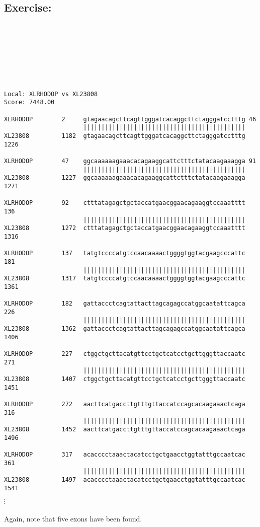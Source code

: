 \documentclass[12pt]{report}
\begin{document}
\subsection*{Exercise: }

\unix{}\\
\\
\\
\\
\\
\\

\unix{}
\begin{verbatim}
Local: XLRHODOP vs XL23808
Score: 7448.00

XLRHODOP        2     gtagaacagcttcagttgggatcacaggcttctagggatcctttg 46   
                      |||||||||||||||||||||||||||||||||||||||||||||
XL23808         1182  gtagaacagcttcagttgggatcacaggcttctagggatcctttg 1226 

XLRHODOP        47    ggcaaaaaagaaacacagaaggcattctttctatacaagaaagga 91   
                      |||||||||||||||||||||||||||||||||||||||||||||
XL23808         1227  ggcaaaaaagaaacacagaaggcattctttctatacaagaaagga 1271 

XLRHODOP        92    ctttatagagctgctaccatgaacggaacagaaggtccaaatttt 136  
                      |||||||||||||||||||||||||||||||||||||||||||||
XL23808         1272  ctttatagagctgctaccatgaacggaacagaaggtccaaatttt 1316 

XLRHODOP        137   tatgtccccatgtccaacaaaactggggtggtacgaagcccattc 181  
                      |||||||||||||||||||||||||||||||||||||||||||||
XL23808         1317  tatgtccccatgtccaacaaaactggggtggtacgaagcccattc 1361 

XLRHODOP        182   gattaccctcagtattacttagcagagccatggcaatattcagca 226  
                      |||||||||||||||||||||||||||||||||||||||||||||
XL23808         1362  gattaccctcagtattacttagcagagccatggcaatattcagca 1406 

XLRHODOP        227   ctggctgcttacatgttcctgctcatcctgcttgggttaccaatc 271  
                      |||||||||||||||||||||||||||||||||||||||||||||
XL23808         1407  ctggctgcttacatgttcctgctcatcctgcttgggttaccaatc 1451 

XLRHODOP        272   aacttcatgaccttgtttgttaccatccagcacaagaaactcaga 316  
                      |||||||||||||||||||||||||||||||||||||||||||||
XL23808         1452  aacttcatgaccttgtttgttaccatccagcacaagaaactcaga 1496 

XLRHODOP        317   acacccctaaactacatcctgctgaacctggtatttgccaatcac 361  
                      |||||||||||||||||||||||||||||||||||||||||||||
XL23808         1497  acacccctaaactacatcctgctgaacctggtatttgccaatcac 1541 
\end{verbatim}
$\vdots$
\\
\\
\noindent Again, note that five exons have been found.
\end{document}
